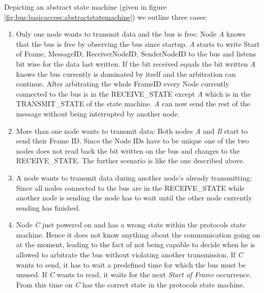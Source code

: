 Depicting an abstract state machine (given in figure \ref{fig:bus:basicaccess:abstractstatemachine}) we outline three cases:
\begin{enumerate}
 \item Only one node wants to transmit data and the bus is free: Node \textit{A} knows that the bus is free by 
observing the bus since startup. \textit{A} starts to write Start of Frame, MessageID, ReceiverNodeID, SenderNodeID  
to the bus and listens bit wise for the data last written.
       If the bit received equals the bit written \textit{A} knows the bus currently is dominated by itself and 
the arbitration can continue. After arbitrating the whole FrameID every Node currently connected to the bus is 
in the RECEIVE\_STATE except \textit{A} which is in the TRANSMIT\_STATE of the state machine.
       \textit{A} can now send the rest of the message without being interrupted by another node.

 \item More than one node wants to transmit data: Both nodes \textit{A} and \textit{B} start to send 
their Frame ID. Since the Node IDs have to be unique one of the two nodes does not read back the bit written on the bus and changes to the RECEIVE\_STATE. The further scenario is like the one described above.

 \item A node wants to transmit data during another node's already transmitting: Since all nodes connected to the bus are in the RECEIVE\_STATE while another node is sending the node has to wait until the other node currently sending has finished.

 \item Node \textit{C} just powered on and has a wrong state within the protocols state machine. Hence it does not know anything about the communication going on at the moment, leading to the fact of not being capable to decide when he is allowed to arbitrate the bus without violating another transmission.
       If \textit{C} wants to send, it has to wait a predefined time for which the bus must be unused. 
If \textit{C} wants to read, it waits for the next \textit{Start of Frame} occurrence. From this time on \textit{C} has the correct state in the protocols state machine.
\end{enumerate}


